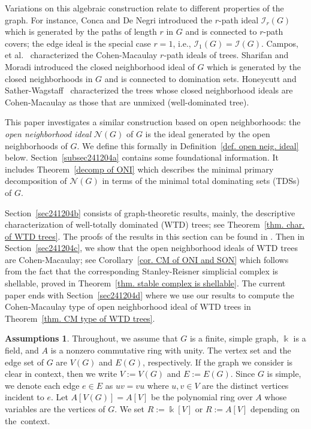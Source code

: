 \documentclass[12pt, reqno]{amsart}
\theoremstyle{definition}
\newtheorem*{assumptions}{Assumptions}
\theoremstyle{plain}
\theoremstyle{definition}
\newcommand{\kk}{\Bbbk}
\newcommand{\NN}{\mathcal{N}}
\newcommand{\II}{\mathcal{I}}
\begin{document}
Variations on this algebraic construction relate to different properties of the graph.
For instance, Conca and De Negri \cite{MR1666661} introduced the $r$-path ideal $\II_r(G)$ which is generated by the paths of length $r$ in $G$ and is connected to $r$-path covers;
the edge ideal is the special case $r = 1$, i.e., $\II_{1}(G) = \II(G)$.
Campos, et al.~\cite{MR3175038} characterized the Cohen-Macaulay $r$-path ideals of trees.
Sharifan and Moradi \cite{MR4132629} introduced the closed neighborhood ideal of $G$ which is generated by the closed neighborhoods in $G$ and is connected to domination sets.
Honeycutt and Sather-Wagstaff~\cite{MR4445927} characterized the trees whose closed neighborhood ideals are Cohen-Macaulay as those that are unmixed (well-dominated tree).

This paper investigates a similar construction based on open neighborhoods: the \emph{open neighborhood ideal} $\NN(G)$ of $G$ is the ideal generated by the open neighborhoods of $G$. 
We define this formally in Definition~\ref{def. open neig. ideal} below. 
Section~\ref{subsec241204a} contains some foundational information. 
It includes Theorem~\ref{decomp of ONI} which describes the minimal primary decomposition of $\NN(G)$ in terms of the minimal total dominating sets (TDSs) of $G$.

Section~\ref{sec241204b} consists of graph-theoretic results, mainly, the descriptive characterization of well-totally dominated (WTD) trees; see Theorem~\ref{thm. char. of WTD trees}.
The proofs of the results in this section can be found in \cite{COURAGE_GT}.
Then in Section~\ref{sec241204c}, we show that the open neighborhood ideals of WTD trees are Cohen-Macaulay; see Corollary~\ref{cor. CM of ONI and SON} which follows from the fact that the corresponding Stanley-Reisner simplicial complex is shellable, proved in Theorem~\ref{thm. stable complex is shellable}. 
The current paper ends with Section~\ref{sec241204d} where we use our results to compute the Cohen-Macaulay type of open neighborhood ideal of WTD trees in Theorem~\ref{thm. CM type of WTD trees}.

\begin{assumptions}
Throughout, we assume that $G$ is a finite, simple graph, $\kk$ is a field, and $A$ is a nonzero commutative ring with unity.
The vertex set and the edge set of $G$ are $V(G)$ and $E(G)$, respectively.
If the graph we consider is clear in context, then we write $V := V(G)$ and $E := E(G)$.
Since $G$ is simple, we denote each edge $e \in E$ as $uv=vu$ where $u,v \in V$ are the distinct vertices incident to $e$.
Let $A[V(G)] = A[V]$ be the polynomial ring over $A$ whose variables are the vertices of $G$.
We set $R := \kk[V]$ or $R := A[V]$ depending on the~context.
\end{assumptions}
\end{document}
